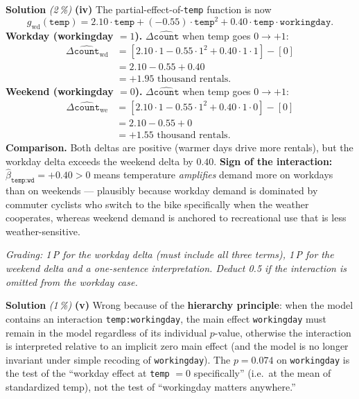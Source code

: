 \documentclass[11pt,a4paper]{article}
\newcommand{\subpoints}[1]{\textit{(#1\,\%)}}
\newcommand{\sol}{\noindent\textbf{Solution}}
\begin{document}
\medskip
\sol{} \subpoints{2} \textbf{(iv)} The partial-effect-of-\texttt{temp} function is now
$$g_{\text{wd}}(\texttt{temp}) = 2.10\cdot\texttt{temp} + (-0.55)\cdot\texttt{temp}^2
   + 0.40\cdot\texttt{temp}\cdot\texttt{workingday}.$$
\textbf{Workday (workingday $=1$).} $\Delta\widehat{\texttt{count}}$ when temp goes $0\to+1$:
\begin{align*}
\Delta\widehat{\texttt{count}}_{\text{wd}}
   &= [2.10\cdot 1 - 0.55\cdot 1^2 + 0.40\cdot 1\cdot 1]
      - [0] \\
   &= 2.10 - 0.55 + 0.40 \\
   &= \boxed{+1.95\text{ thousand rentals}.}
\end{align*}
\textbf{Weekend (workingday $=0$).} $\Delta\widehat{\texttt{count}}$ when temp goes $0\to+1$:
\begin{align*}
\Delta\widehat{\texttt{count}}_{\text{we}}
   &= [2.10\cdot 1 - 0.55\cdot 1^2 + 0.40\cdot 1\cdot 0] - [0] \\
   &= 2.10 - 0.55 + 0 \\
   &= \boxed{+1.55\text{ thousand rentals}.}
\end{align*}
\textbf{Comparison.} Both deltas are positive (warmer days drive more rentals), but the workday
delta exceeds the weekend delta by $0.40$. \textbf{Sign of the interaction:} $\hat\beta_{\texttt{temp:wd}}
= +0.40 > 0$ means temperature \emph{amplifies} demand more on workdays than on weekends ---
plausibly because workday demand is dominated by commuter cyclists who switch to the bike
specifically when the weather cooperates, whereas weekend demand is anchored to recreational use
that is less weather-sensitive.

\noindent\emph{Grading: 1\,P for the workday delta (must include all three terms), 1\,P for the
weekend delta and a one-sentence interpretation. Deduct 0.5 if the interaction is omitted from the
workday case.}

\medskip
\sol{} \subpoints{1} \textbf{(v)} Wrong because of the \textbf{hierarchy principle}: when the model
contains an interaction \texttt{temp:workingday}, the main effect \texttt{workingday} must remain
in the model regardless of its individual $p$-value, otherwise the interaction is interpreted
relative to an implicit zero main effect (and the model is no longer invariant under simple
recoding of \texttt{workingday}). The $p = 0.074$ on \texttt{workingday} is the test of the
``workday effect at \texttt{temp} $= 0$ specifically'' (i.e.\ at the mean of standardized temp), not
the test of ``workingday matters anywhere.''
\end{document}
